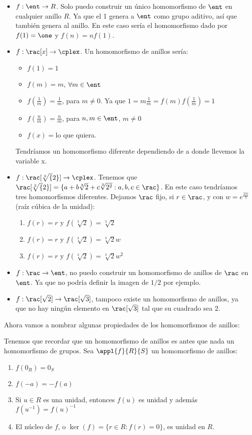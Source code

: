\begin{example}
	\begin{itemize}
		\item $f:\ent \rightarrow R$. Solo puedo construir un único homomorfismo de $\ent$ en cualquier anillo $R$. Ya que el 1 genera a $\ent$ como grupo aditivo, así que también genera al anillo. En este caso sería el homomorfismo dado por $f(1)=\one$ y $f(n)=nf(1)$.
		\item $f: \rac[x] \rightarrow \cplex$. Un homomorfismo de anillos sería:
		\begin{itemize}
			\item $f(1)=1$
			\item $f(m)=m$, $\forall m \in \ent$
			\item $f(\frac{1}{m})=\frac{1}{m}$, para $m\neq 0$. Ya que $1=m\frac{1}{m}=f(m)f(\frac{1}{m})=1$
			\item $f(\frac{n}{m})=\frac{n}{m}$, para $n,m \in \ent$, $m\neq 0$
			\item $f(x)=$lo que quiera.
		\end{itemize}
		 Tendríamos un homomorfismo diferente dependiendo de a donde llevemos la variable x.
		 \item $f: \rac[\sqrt[3]{2}]\rightarrow \cplex$. Tenemos que $\rac[\sqrt[3]{2}] = \{a+b\sqrt[3]{2}+c\sqrt[3]{2^2}:a,b,c \in \rac\}$. En este caso tendríamos tres homomorfismos diferentes. Dejamos $\rac$ fijo, si $r\in \rac$, y con $w=e^{\frac{2\pi i}{3}}$ (raíz cúbica de la unidad):
		 \begin{enumerate}
		 	\item $f(r)=r$ y $f(\sqrt[3]{2})=\sqrt[3]{2}$
		 	\item $f(r)=r$ y $f(\sqrt[3]{2})=\sqrt[3]{2}w$
			 \item $f(r)=r$ y $f(\sqrt[3]{2})=\sqrt[3]{2}w^2$
		 \end{enumerate}
		 \item $f: \rac \rightarrow \ent$, no puedo construir un homomorfismo de anillos de $\rac$ en $\ent$. Ya que no podría definir la imagen de $1/2$ por ejemplo.
		 \item $f: \rac[\sqrt{2}]\rightarrow \rac[\sqrt{3}]$, tampoco existe un homomorfismo de anillos, ya que no hay ningún elemento en $\rac[\sqrt{3}]$ tal que su cuadrado sea 2.
	\end{itemize}
\end{example}

Ahora vamos a nombrar algunas propiedades de los homomorfismos de anillos:

Tenemos que recordar que un homomorfismo de anillos es antes que nada un homomorfismo de grupos. Sea $\appl{f}{R}{S}$ un homomorfismo de anillos:
\begin{enumerate}
\item $f(0_R)=0_S$
\item $f(-a)=-f(a)$
\item Si $u \in R$ es una unidad, entonces $f(u)$ es unidad y además $f(u^{-1})=f(u)^{-1}$
\item El núcleo de $f$, o $\ker(f)=\{ r \in R: f(r)=0 \}$, es unidad en $R$.
\end{enumerate}

